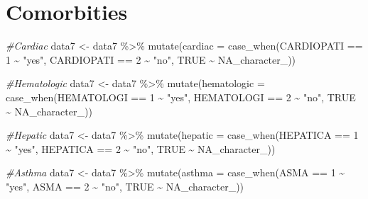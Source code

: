 \documentclass[
]{article}
\newenvironment{Shaded}{\begin{snugshade}}{\end{snugshade}}
\newcommand{\AttributeTok}[1]{\textcolor[rgb]{0.77,0.63,0.00}{#1}}
\newcommand{\CommentTok}[1]{\textcolor[rgb]{0.56,0.35,0.01}{\textit{#1}}}
\newcommand{\ConstantTok}[1]{\textcolor[rgb]{0.00,0.00,0.00}{#1}}
\newcommand{\DecValTok}[1]{\textcolor[rgb]{0.00,0.00,0.81}{#1}}
\newcommand{\FunctionTok}[1]{\textcolor[rgb]{0.00,0.00,0.00}{#1}}
\newcommand{\NormalTok}[1]{#1}
\newcommand{\OtherTok}[1]{\textcolor[rgb]{0.56,0.35,0.01}{#1}}
\newcommand{\SpecialCharTok}[1]{\textcolor[rgb]{0.00,0.00,0.00}{#1}}
\newcommand{\StringTok}[1]{\textcolor[rgb]{0.31,0.60,0.02}{#1}}
\begin{document}
\hypertarget{comorbities}{%
\section{Comorbities}\label{comorbities}}

\begin{Shaded}
\begin{Highlighting}[]
\CommentTok{\#Cardiac}
\NormalTok{data7 }\OtherTok{\textless{}{-}}\NormalTok{  data7 }\SpecialCharTok{\%\textgreater{}\%}
  \FunctionTok{mutate}\NormalTok{(}\AttributeTok{cardiac =} \FunctionTok{case\_when}\NormalTok{(CARDIOPATI }\SpecialCharTok{==} \DecValTok{1} \SpecialCharTok{\textasciitilde{}} \StringTok{"yes"}\NormalTok{,}
\NormalTok{                             CARDIOPATI }\SpecialCharTok{==} \DecValTok{2} \SpecialCharTok{\textasciitilde{}} \StringTok{"no"}\NormalTok{,}
                             \ConstantTok{TRUE} \SpecialCharTok{\textasciitilde{}} \ConstantTok{NA\_character\_}\NormalTok{))}

\CommentTok{\#Hematologic}
\NormalTok{data7 }\OtherTok{\textless{}{-}}\NormalTok{  data7 }\SpecialCharTok{\%\textgreater{}\%}
  \FunctionTok{mutate}\NormalTok{(}\AttributeTok{hematologic =} \FunctionTok{case\_when}\NormalTok{(HEMATOLOGI }\SpecialCharTok{==} \DecValTok{1} \SpecialCharTok{\textasciitilde{}} \StringTok{"yes"}\NormalTok{,}
\NormalTok{                                 HEMATOLOGI }\SpecialCharTok{==} \DecValTok{2} \SpecialCharTok{\textasciitilde{}} \StringTok{"no"}\NormalTok{,}
                                 \ConstantTok{TRUE} \SpecialCharTok{\textasciitilde{}} \ConstantTok{NA\_character\_}\NormalTok{))}

\CommentTok{\#Hepatic}
\NormalTok{data7 }\OtherTok{\textless{}{-}}\NormalTok{  data7 }\SpecialCharTok{\%\textgreater{}\%}
  \FunctionTok{mutate}\NormalTok{(}\AttributeTok{hepatic =} \FunctionTok{case\_when}\NormalTok{(HEPATICA }\SpecialCharTok{==} \DecValTok{1} \SpecialCharTok{\textasciitilde{}} \StringTok{"yes"}\NormalTok{,}
\NormalTok{                             HEPATICA }\SpecialCharTok{==} \DecValTok{2} \SpecialCharTok{\textasciitilde{}} \StringTok{"no"}\NormalTok{,}
                             \ConstantTok{TRUE} \SpecialCharTok{\textasciitilde{}} \ConstantTok{NA\_character\_}\NormalTok{))}

\CommentTok{\#Asthma}
\NormalTok{data7 }\OtherTok{\textless{}{-}}\NormalTok{  data7 }\SpecialCharTok{\%\textgreater{}\%}
  \FunctionTok{mutate}\NormalTok{(}\AttributeTok{asthma =} \FunctionTok{case\_when}\NormalTok{(ASMA }\SpecialCharTok{==} \DecValTok{1} \SpecialCharTok{\textasciitilde{}} \StringTok{"yes"}\NormalTok{,}
\NormalTok{                            ASMA }\SpecialCharTok{==} \DecValTok{2} \SpecialCharTok{\textasciitilde{}} \StringTok{"no"}\NormalTok{,}
                            \ConstantTok{TRUE} \SpecialCharTok{\textasciitilde{}} \ConstantTok{NA\_character\_}\NormalTok{))}


\end{Highlighting}
\end{Shaded}
\end{document}
